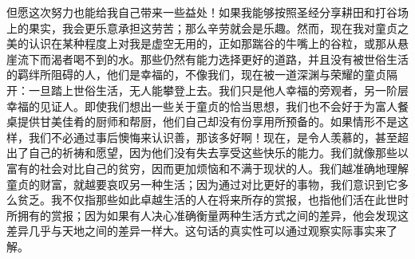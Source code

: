 但愿这次努力也能给我自己带来一些益处！如果我能够按照圣经分享耕田和打谷场上的果实，我会更乐意承担这劳苦；那么辛劳就会是乐趣。然而，现在我对童贞之美的认识在某种程度上对我是虚空无用的，正如那踹谷的牛嘴上的谷粒，或那从悬崖流下而渴者喝不到的水。那些仍然有能力选择更好的道路，并且没有被世俗生活的羁绊所阻碍的人，他们是幸福的，不像我们，现在被一道深渊与荣耀的童贞隔开：一旦踏上世俗生活，无人能攀登上去。我们只是他人幸福的旁观者，另一阶层幸福的见证人。即使我们想出一些关于童贞的恰当思想，我们也不会好于为富人餐桌提供甘美佳肴的厨师和帮厨，他们自己却没有份享用所预备的。如果情形不是这样，我们不必通过事后懊悔来认识善，那该多好啊！现在，是令人羡慕的，甚至超出了自己的祈祷和愿望，因为他们没有失去享受这些快乐的能力。我们就像那些以富有的社会对比自己的贫穷，因而更加烦恼和不满于现状的人。我们越准确地理解童贞的财富，就越要哀叹另一种生活；因为通过对比更好的事物，我们意识到它多么贫乏。我不仅指那些如此卓越生活的人在将来所存的赏报，也指他们活在此世时所拥有的赏报；因为如果有人决心准确衡量两种生活方式之间的差异，他会发现这差异几乎与天地之间的差异一样大。这句话的真实性可以通过观察实际事实来了解。\par

